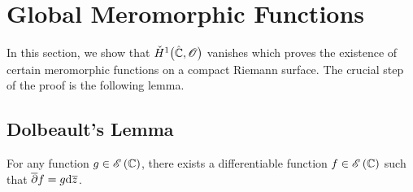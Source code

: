 \documentclass[../Moduli_Spaces_of_Riemann_Surfaces.tex]{subfiles}
\begin{document}
    \section{Global Meromorphic Functions}\label{CC:sec:global_meromorphic_functions}
    In this section, we show that $\check{H}^1\big(\hat{\mathbb{C}},\mathscr{O}\big)$ vanishes which proves the existence of certain meromorphic functions on a compact Riemann surface. The crucial step of the proof is the following lemma.
    \subsection{Dolbeault's Lemma}
    \begin{lemma}[Dolbeault]
        For any function $g\in\mathscr{E}\left(\mathbb{C}\right)$, there exists a differentiable function $f\in\mathscr{E}\left(\mathbb{C}\right)$ such that $\overline{\partial}f=g\mathrm{d}\overline{z}$.
    \end{lemma}
\end{document}

